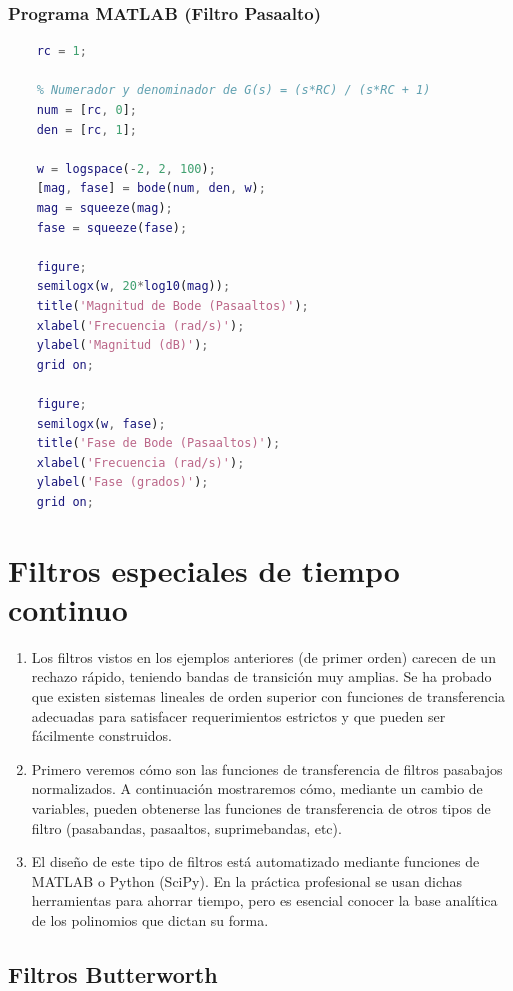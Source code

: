 \documentclass[11pt,a4paper,openany]{book}
\begin{document}
\subsubsection{Programa MATLAB (Filtro Pasaalto)}

\begin{lstlisting}[language=Matlab]
	% Constante RC = 1
	rc = 1;
	
	% Numerador y denominador de G(s) = (s*RC) / (s*RC + 1)
	num = [rc, 0];
	den = [rc, 1];
	
	w = logspace(-2, 2, 100);
	[mag, fase] = bode(num, den, w);
	mag = squeeze(mag);
	fase = squeeze(fase);
	
	figure;
	semilogx(w, 20*log10(mag));
	title('Magnitud de Bode (Pasaaltos)');
	xlabel('Frecuencia (rad/s)');
	ylabel('Magnitud (dB)');
	grid on;
	
	figure;
	semilogx(w, fase);
	title('Fase de Bode (Pasaaltos)');
	xlabel('Frecuencia (rad/s)');
	ylabel('Fase (grados)');
	grid on;
\end{lstlisting}

\section{Filtros especiales de tiempo continuo}

\begin{enumerate}
	\item Los filtros vistos en los ejemplos anteriores (de primer orden) carecen de un rechazo rápido, teniendo bandas de transición muy amplias. Se ha probado que existen sistemas lineales de orden superior con funciones de transferencia adecuadas para satisfacer requerimientos estrictos y que pueden ser f\'{a}cilmente construidos.
	\item Primero veremos c\'{o}mo son las funciones de transferencia de filtros pasabajos normalizados. A continuaci\'{o}n mostraremos c\'{o}mo, mediante un cambio de variables, pueden obtenerse las funciones de transferencia de otros tipos de filtro (pasabandas, pasaaltos, suprimebandas, etc).
	\item El dise\~{n}o de este tipo de filtros est\'{a} automatizado mediante funciones de MATLAB o Python (SciPy). En la pr\'{a}ctica profesional se usan dichas herramientas para ahorrar tiempo, pero es esencial conocer la base analítica de los polinomios que dictan su forma.
\end{enumerate}

\subsection{Filtros Butterworth}
\end{document}
